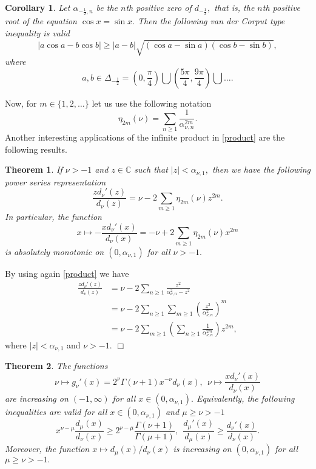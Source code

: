 \documentclass[journal]{IEEEtran}
\newtheorem{theorem}{Theorem}
\newtheorem{corollary}{Corollary}[theorem]
\begin{document}
\begin{corollary}
{\em Let $\alpha_{-\frac{1}{2},n}$ be the $n$th positive zero of $d_{-\frac{1}{2}},$ that is, the $n$th positive root of the equation
$\cos x=\sin x.$ Then the following van der Corput type inequality is valid
$$\left|a\cos a-b\cos b\right|\geq |a-b|\sqrt{(\cos a-\sin a)(\cos b-\sin b)},$$
where $$a,b\in\Delta_{-\frac{1}{2}}=\left(0,\frac{\pi}{4}\right)\bigcup\left(\frac{5\pi}{4},\frac{9\pi}{4}\right)\bigcup{\dots}.$$}
\end{corollary}

Now, for $m\in\{1,2,\dots\}$ let us use the following notation
$$\eta_{2m}(\nu)=\sum_{n\geq 1}\frac{1}{\alpha_{\nu,n}^{2m}}.$$
Another interesting applications of the infinite product in \eqref{product} are the following results.

\begin{theorem}
{\em If $\nu>-1$ and $z\in\mathbb{C}$ such that $|z|<\alpha_{\nu,1},$ then we have the following power series representation
\begin{equation}\label{quo}\frac{zd_{\nu}'(z)}{d_{\nu}(z)}=\nu-2\sum_{m\geq 1}\eta_{2m}(\nu)z^{2m}.\end{equation}
In particular, the function
$$x\mapsto -\frac{xd_{\nu}'(x)}{d_{\nu}(x)}=-\nu+2\sum_{m\geq 1}\eta_{2m}(\nu)x^{2m}$$
is absolutely monotonic on $(0,\alpha_{\nu,1})$ for all $\nu>-1.$}
\end{theorem}

 By using again \eqref{product} we have
\begin{align*}\frac{zd_{\nu}'(z)}{d_{\nu}(z)}&=\nu-2\sum_{n\geq 1}\frac{z^2}{\alpha_{\nu,n}^2-z^2}\\&
=\nu-2\sum_{n\geq 1}\sum_{m\geq1}\left(\frac{z^2}{\alpha_{\nu,n}^2}\right)^m\\
&=\nu-2\sum_{m\geq 1}\left(\sum_{n\geq1}\frac{1}{\alpha_{\nu,n}^{2m}}\right)z^{2m},\end{align*}
where $|z|<\alpha_{\nu,1}$ and $\nu>-1.$ \medskip \hfill $\Box$

\begin{theorem}
{\em The functions
$$\nu\mapsto g_{\nu}'(x)=2^{\nu}\Gamma(\nu+1)x^{-\nu}d_{\nu}(x),\ \ \nu\mapsto \frac{xd_{\nu}'(x)}{d_{\nu}(x)}$$
are increasing on $(-1,\infty)$ for all $x\in(0,\alpha_{\nu,1}).$ Equivalently, the following inequalities
are valid for all $x\in(0,\alpha_{\nu,1})$ and $\mu\geq\nu>-1$
\begin{equation}\label{vege}x^{\nu-\mu}\frac{d_{\mu}(x)}{d_{\nu}(x)}\geq 2^{\nu-\mu}\frac{\Gamma(\nu+1)}{\Gamma(\mu+1)}, \ \ \frac{d_{\mu}'(x)}{d_{\mu}(x)}\geq\frac{d_{\nu}'(x)}{d_{\nu}(x)}.\end{equation}
Moreover, the function $x\mapsto d_{\mu}(x)/d_{\nu}(x)$ is increasing on $(0,\alpha_{\nu,1})$ for all $\mu\geq\nu>-1.$}
\end{theorem}
\end{document}
